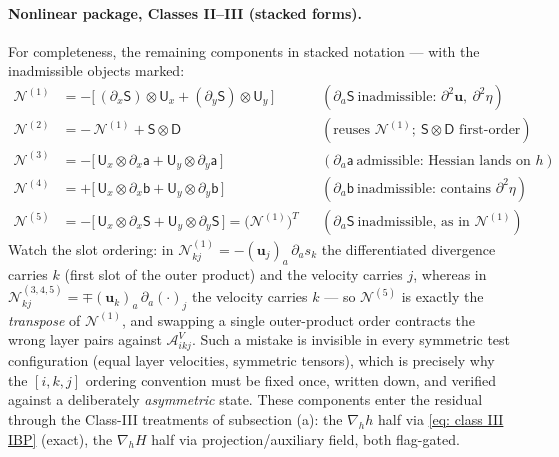 \documentclass{article}
\newcommand{\uj}{\mathbf{u}_j}
\newcommand{\uk}{\mathbf{u}_k}
\newcommand{\nablah}{\nabla_h}
\newcommand{\VAikj}{\boldsymbol{\mathcal{A}}_{ikj}^V}
\begin{document}
\paragraph{Nonlinear package, Classes II--III (stacked forms).} For completeness, the remaining components in stacked notation — with the inadmissible objects marked:
\begin{equation}
\begin{aligned}
    \mathcal{N}^{(1)} &= -\big[\, (\partial_x\mathsf{S})\otimes\mathsf{U}_x + (\partial_y\mathsf{S})\otimes\mathsf{U}_y \,\big] &&(\partial_a\mathsf{S}\ \text{inadmissible: } \partial^2\mathbf{u},\ \partial^2\eta)\\
    \mathcal{N}^{(2)} &= -\,\mathcal{N}^{(1)} + \mathsf{S}\otimes\mathsf{D} &&(\text{reuses } \mathcal{N}^{(1)}; \ \mathsf{S}\otimes\mathsf{D} \text{ first-order})\\
    \mathcal{N}^{(3)} &= -\big[\, \mathsf{U}_x\otimes\partial_x\mathsf{a} + \mathsf{U}_y\otimes\partial_y\mathsf{a} \,\big] &&(\partial_a\mathsf{a}\ \text{admissible: Hessian lands on } h)\\
    \mathcal{N}^{(4)} &= +\big[\, \mathsf{U}_x\otimes\partial_x\mathsf{b} + \mathsf{U}_y\otimes\partial_y\mathsf{b} \,\big] &&(\partial_a\mathsf{b}\ \text{inadmissible: contains } \partial^2\eta)\\
    \mathcal{N}^{(5)} &= -\big[\, \mathsf{U}_x\otimes\partial_x\mathsf{S} + \mathsf{U}_y\otimes\partial_y\mathsf{S} \,\big] = \big(\mathcal{N}^{(1)}\big)^{\!T} &&(\partial_a\mathsf{S}\ \text{inadmissible, as in } \mathcal{N}^{(1)})
\end{aligned}
\label{eq: stacked N1to5}
\end{equation}
Watch the slot ordering: in $\mathcal{N}^{(1)}_{kj} = -(\uj)_a\,\partial_a s_k$ the differentiated divergence carries $k$ (first slot of the outer product) and the velocity carries $j$, whereas in $\mathcal{N}^{(3,4,5)}_{kj} = \mp(\uk)_a\,\partial_a(\cdot)_j$ the velocity carries $k$ — so $\mathcal{N}^{(5)}$ is exactly the \emph{transpose} of $\mathcal{N}^{(1)}$, and swapping a single outer-product order contracts the wrong layer pairs against $\VAikj$. Such a mistake is invisible in every symmetric test configuration (equal layer velocities, symmetric tensors), which is precisely why the $[i,k,j]$ ordering convention must be fixed once, written down, and verified against a deliberately \emph{asymmetric} state. These components enter the residual through the Class-III treatments of subsection (a): the $\nablah h$ half via \eqref{eq: class III IBP} (exact), the $\nablah H$ half via projection/auxiliary field, both flag-gated.
\end{document}
